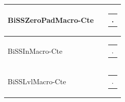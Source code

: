\documentclass[openany]{article}
\begin{document}
\begin{longtable}{| m{4.5cm} m{2.5cm}  m{8.5cm} |}
        BiSSZeroPadMacro-Cte &  & \begin{tabular}{@{}m{6cm}@{}}
                .
            \end{tabular} \hypertarget{pv:biss-in-macro-cte}{}\\ \hline
        BiSSInMacro-Cte &  & \begin{tabular}{@{}m{6cm}@{}}
                .
            \end{tabular} \hypertarget{pv:biss-lvl-macro-cte}{}\\ \hline
        BiSSLvlMacro-Cte &  & \begin{tabular}{@{}m{6cm}@{}}
                .
            \end{tabular} \hypertarget{}{}\\ \hline
    \end{longtable}
\end{document}
